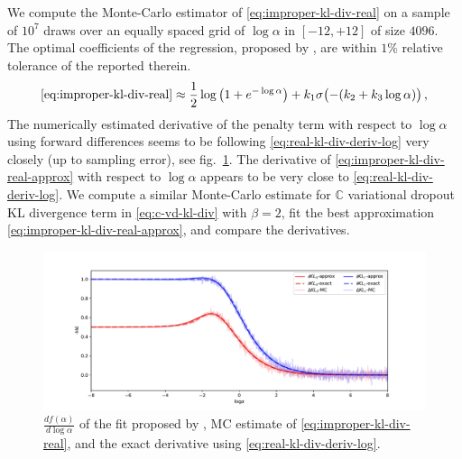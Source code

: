 \documentclass[a4paper,10pt]{article}
\newcommand{\cplx}{\mathbb{C}}
\begin{document}
We compute the Monte-Carlo estimator of \eqref{eq:improper-kl-div-real} on a sample of $10^7$
draws over an equally spaced grid of $\log \alpha$ in $[-12, +12]$ of size $4096$. The optimal
coefficients of the regression, proposed by \citet{molchanov_variational_2017}, are within
$1\%$ relative tolerance of the reported therein.
\begin{equation}  \label{eq:improper-kl-div-real-approx}
  \eqref{eq:improper-kl-div-real}
  \approx
    \frac12 \log{\bigl(1 + e^{-\log \alpha}\bigr)}
    + k_1 \sigma\bigl(- (k_2 + k_3 \log \alpha)\bigr)
  \,,
\end{equation}
The numerically estimated derivative of the penalty term with respect to $\log \alpha$ using
forward differences seems to be following \eqref{eq:real-kl-div-deriv-log} very closely (up to
sampling error), see fig.~\ref{fig:molchanov-derivative-replica}. The derivative of
\eqref{eq:improper-kl-div-real-approx} with respect to $\log \alpha$ appears to be very close
to \eqref{eq:real-kl-div-deriv-log}. We compute a similar Monte-Carlo estimate for
$\cplx$ variational dropout KL divergence term in \eqref{eq:c-vd-kl-div} with $\beta = 2$,
fit the best approximation \eqref{eq:improper-kl-div-real-approx}, and compare the derivatives.

\begin{figure}[!h]
  \centering
  \includegraphics[width=\linewidth]{../notebooks/assets/grad_log.pdf}
  \caption{$\tfrac{d f(\alpha)}{d \log{\alpha}}$ of the fit proposed by
  \citet{molchanov_variational_2017}, MC estimate of \eqref{eq:improper-kl-div-real},
  and the exact derivative using \eqref{eq:real-kl-div-deriv-log}.}
  \label{fig:molchanov-derivative-replica}
\end{figure}
\end{document}
